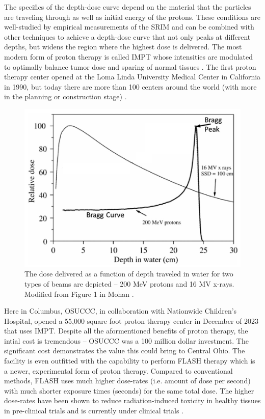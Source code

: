 The specifics of the depth-dose curve depend on the material that the particles are traveling through as well as initial energy of the protons. These conditions are well-studied by empirical measurements of the \gls{SRIM} \cite{Ziegler_2010_SRIM} and can be combined with other techniques to achieve a depth-dose curve that not only peaks at different depths, but widens the region where the highest dose is delivered. The most modern form of proton therapy is called \gls{IMPT} whose intensities are modulated to optimally balance tumor dose and sparing of normal tissues \cite{Mohan_2022_PRO}. The first proton therapy center opened at the Loma Linda University Medical Center in California in 1990, but today there are more than 100 centers around the world (with more in the planning or construction stage) \cite{Mohan_2022_PRO}. 

\begin{figure}
	\centering
	\includegraphics[width=0.75\linewidth]{planning/images/bragg_curve.PNG}
	\caption{The dose delivered as a function of depth traveled in water for two types of beams are depicted -- 200 MeV protons and 16 MV x-rays. Modified from Figure 1 in Mohan \cite{Mohan_2022_PRO}.}
	\label{fig:bragg_curve}
\end{figure}
 
Here in Columbus, \gls{OSUCCC}, in collaboration with Nationwide Children's Hospital, opened a 55,000 square foot proton therapy center in December of 2023 \cite{OSU_CCC} that uses \gls{IMPT}. Despite all the aformentioned benefits of proton therapy, the intial cost is tremendous -- \gls{OSUCCC} was a 100 million dollar investment. The significant cost demonstrates the value this could bring to Central Ohio. The facility is even outfitted with the capability to perform FLASH therapy which is a newer, experimental form of proton therapy. Compared to conventional methods, FLASH uses much higher dose-rates (i.e. amount of dose per second) with much shorter exposure times (seconds) for the same total dose. The higher dose-rates have been shown to reduce radiation-induced toxicity in healthy tissues in pre-clinical trials \cite{Matuszak_2022_Onc} and is currently under clinical trials \cite{OSU_CCC}. 

